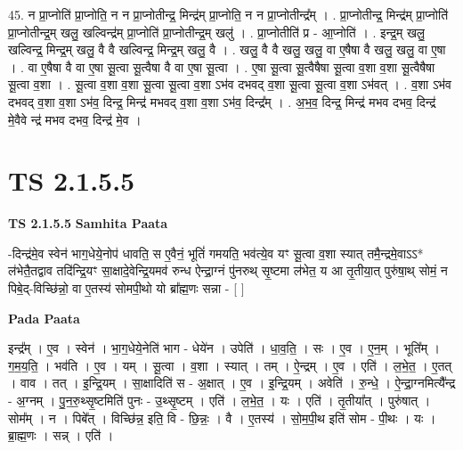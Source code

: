 \documentclass[17pt]{extarticle}
\begin{document}
45. न प्रा॒प्नोति॑ प्रा॒प्नोति॒ न न प्रा॒प्नोतीन्द्र॒ मिन्द्र॑म् प्रा॒प्नोति॒ न न प्रा॒प्नोतीन्द्र᳚म् । . प्रा॒प्नोतीन्द्र॒ मिन्द्र॑म् प्रा॒प्नोति॑ प्रा॒प्नोतीन्द्र॒म् खलु॒ खल्विन्द्र॑म् प्रा॒प्नोति॑ प्रा॒प्नोतीन्द्र॒म् खलु॑ । . प्रा॒प्नोतीति॑ प्र - आ॒प्नोति॑ । . इन्द्र॒म् खलु॒ खल्विन्द्र॒ मिन्द्र॒म् खलु॒ वै वै खल्विन्द्र॒ मिन्द्र॒म् खलु॒ वै । . खलु॒ वै वै खलु॒ खलु॒ वा ए॒षैषा वै खलु॒ खलु॒ वा ए॒षा । . वा ए॒षैषा वै वा ए॒षा सू॒त्वा सू॒त्वैषा वै वा ए॒षा सू॒त्वा । . ए॒षा सू॒त्वा सू॒त्वैषैषा सू॒त्वा व॒शा व॒शा सू॒त्वैषैषा सू॒त्वा व॒शा । . सू॒त्वा व॒शा व॒शा सू॒त्वा सू॒त्वा व॒शा ऽभ॑व दभवद् व॒शा सू॒त्वा सू॒त्वा व॒शा ऽभ॑वत् । . व॒शा ऽभ॑व दभवद् व॒शा व॒शा ऽभ॑व॒ दिन्द्र॒ मिन्द्र॑ मभवद् व॒शा व॒शा ऽभ॑व॒ दिन्द्र᳚म् । . अ॒भ॒व॒ दिन्द्र॒ मिन्द्र॑ मभव दभव॒ दिन्द्र॑ मे॒वैवे न्द्र॑ मभव दभव॒ दिन्द्र॑ मे॒व । \newline
\pagebreak
{}
\section*{ TS 2.1.5.5 }

\textbf{TS 2.1.5.5 } \newline
\textbf{Samhita Paata} \newline

-दिन्द्र॑मे॒व स्वेन॑ भाग॒धेये॒नोप॑ धावति॒ स ए॒वैनं॒ भूतिं॑ गमयति॒ भव॑त्ये॒व यꣳ सू॒त्वा व॒शा स्यात् तमै॒न्द्रमे॒वाऽऽ* ल॑भेतै॒तद्वाव तदि॑न्द्रि॒यꣳ सा॒क्षादे॒वेन्द्रि॒यमव॑ रुन्ध ऐन्द्रा॒ग्नं पु॑नरुथ् सृ॒ष्टमा ल॑भेत॒ य आ तृ॒तीया॒त् पुरु॑षा॒थ् सोमं॒ न पिबे॒द्-विच्छि॑न्नो॒ वा ए॒तस्य॑ सोमपी॒थो यो ब्रा᳚ह्म॒णः सन्ना - [  ] \newline

\textbf{Pada Paata} \newline

इन्द्र᳚म् । ए॒व । स्वेन॑ । भा॒ग॒धेये॒नेति॑ भाग - धेये॑न । उपेति॑ । धा॒व॒ति॒ । सः । ए॒व । ए॒न॒म् । भूति᳚म् । ग॒म॒य॒ति॒ । भव॑ति । ए॒व । यम् । सू॒त्वा । व॒शा । स्यात् । तम् । ऐ॒न्द्रम् । ए॒व । एति॑ । ल॒भे॒त॒ । ए॒तत् । वाव । तत् । इ॒न्द्रि॒यम् । सा॒क्षादिति॑ स - अ॒क्षात् । ए॒व । इ॒न्द्रि॒यम् । अवेति॑ । रु॒न्धे॒ । ऐ॒न्द्रा॒ग्नमित्यै᳚न्द्र - अ॒ग्नम् । पु॒न॒रु॒थ्सृ॒ष्टमिति॑ पुनः - उ॒थ्सृ॒ष्टम् । एति॑ । ल॒भे॒त॒ । यः । एति॑ । तृ॒तीया᳚त् । पुरु॑षात् । सोम᳚म् । न । पिबे᳚त् । विच्छि॑न्न॒ इति॒ वि - छि॒न्नः॒ । वै । ए॒तस्य॑ । सो॒म॒पी॒थ इति॑ सोम - पी॒थः । यः । ब्रा॒ह्म॒णः । सन्न् । एति॑ ।  \newline
\end{document}
